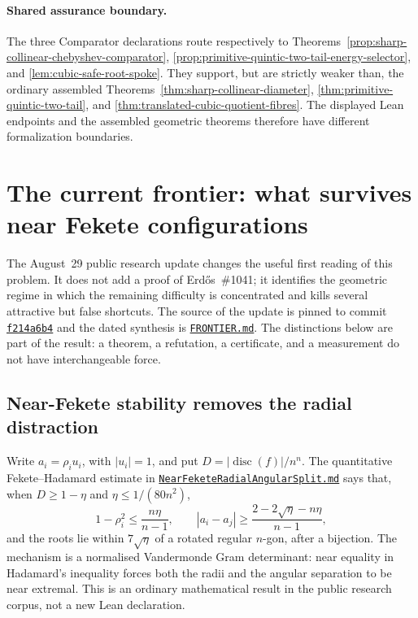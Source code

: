 \documentclass[11pt]{article}
\begin{document}
\paragraph{Shared assurance boundary.}
\label{bdry:solved-polynomial-families}
The three Comparator declarations route respectively to
Theorems~\ref{prop:sharp-collinear-chebyshev-comparator},
\ref{prop:primitive-quintic-two-tail-energy-selector}, and
\ref{lem:cubic-safe-root-spoke}.  They support, but are strictly weaker than,
the ordinary assembled Theorems~\ref{thm:sharp-collinear-diameter},
\ref{thm:primitive-quintic-two-tail}, and
\ref{thm:translated-cubic-quotient-fibres}.  The displayed Lean endpoints and the assembled geometric theorems therefore
have different formalization boundaries.

\section{The current frontier: what survives near Fekete configurations}
\label{sec:frontier}

The August~29 public research update changes the useful first reading of this
problem.  It does not add a proof of Erd\H{o}s~\#1041; it identifies the
geometric regime in which the remaining difficulty is concentrated and kills
several attractive but false shortcuts.  The source of the update is pinned to
commit
\href{https://github.com/wcook04/plectis-erdos/tree/f214a6b45528dc5eefe20ffadc35f2e981627d4c/research_corpus/Erdos1041}{\texttt{f214a6b4}}
and the dated synthesis is
\href{https://github.com/wcook04/plectis-erdos/blob/f214a6b45528dc5eefe20ffadc35f2e981627d4c/research_corpus/Erdos1041/FRONTIER.md}{\texttt{FRONTIER.md}}.
The distinctions below are part of the result: a theorem, a refutation, a
certificate, and a measurement do not have interchangeable force.

\subsection*{Near-Fekete stability removes the radial distraction}

Write $a_i=\rho_i u_i$, with $|u_i|=1$, and put
$D=|\operatorname{disc}(f)|/n^n$.  The quantitative
Fekete--Hadamard estimate in
\href{https://github.com/wcook04/plectis-erdos/blob/f214a6b45528dc5eefe20ffadc35f2e981627d4c/research_corpus/Erdos1041/NearFeketeRadialAngularSplit.md}{\texttt{NearFeketeRadialAngularSplit.md}}
says that, when $D\ge1-\eta$ and
$\eta\le1/(80n^2)$,
\[
  1-\rho_i^2\le \frac{n\eta}{n-1},\qquad
  |a_i-a_j|\ge \frac{2-2\sqrt\eta-n\eta}{n-1},
\]
and the roots lie within $7\sqrt\eta$ of a rotated regular $n$-gon, after a
bijection.  The mechanism is a normalised Vandermonde Gram determinant:
near equality in Hadamard's inequality forces both the radii and the angular
separation to be near extremal.  This is an ordinary mathematical result in
the public research corpus, not a new Lean declaration.
\end{document}
